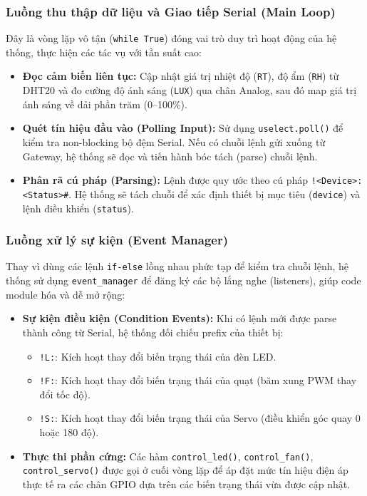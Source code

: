 \subsubsection{Luồng thu thập dữ liệu và Giao tiếp Serial (Main Loop)}
Đây là vòng lặp vô tận (\texttt{while True}) đóng vai trò duy trì hoạt động của hệ thống, thực hiện các tác vụ với tần suất cao:
\begin{itemize}
    \item \textbf{Đọc cảm biến liên tục:} Cập nhật giá trị nhiệt độ (\texttt{RT}), độ ẩm (\texttt{RH}) từ DHT20 và đo cường độ ánh sáng (\texttt{LUX}) qua chân Analog, sau đó map giá trị ánh sáng về dải phần trăm (0--100\%).
    \item \textbf{Quét tín hiệu đầu vào (Polling Input):} Sử dụng \texttt{uselect.poll()} để kiểm tra non-blocking bộ đệm Serial. Nếu có chuỗi lệnh gửi xuống từ Gateway, hệ thống sẽ đọc và tiến hành bóc tách (parse) chuỗi lệnh.
    \item \textbf{Phân rã cú pháp (Parsing):} Lệnh được quy ước theo cú pháp \texttt{!<Device>:<Status>\#}. Hệ thống sẽ tách chuỗi để xác định thiết bị mục tiêu (\texttt{device}) và lệnh điều khiển (\texttt{status}).
\end{itemize}

\subsubsection{Luồng xử lý sự kiện (Event Manager)}
Thay vì dùng các lệnh \texttt{if-else} lồng nhau phức tạp để kiểm tra chuỗi lệnh, hệ thống sử dụng \texttt{event\_manager} để đăng ký các bộ lắng nghe (listeners), giúp code module hóa và dễ mở rộng:
\begin{itemize}
    \item \textbf{Sự kiện điều kiện (Condition Events):} Khi có lệnh mới được parse thành công từ Serial, hệ thống đối chiếu prefix của thiết bị:
    \begin{itemize}
        \item \texttt{!L:}: Kích hoạt thay đổi biến trạng thái của đèn LED.
        \item \texttt{!F:}: Kích hoạt thay đổi biến trạng thái của quạt (băm xung PWM thay đổi tốc độ).
        \item \texttt{!S:}: Kích hoạt thay đổi biến trạng thái của Servo (điều khiển góc quay 0 hoặc 180 độ).
    \end{itemize}
    \item \textbf{Thực thi phần cứng:} Các hàm \texttt{control\_led()}, \texttt{control\_fan()}, \texttt{control\_servo()} được gọi ở cuối vòng lặp để áp đặt mức tín hiệu điện áp thực tế ra các chân GPIO dựa trên các biến trạng thái vừa được cập nhật.
\end{itemize}

